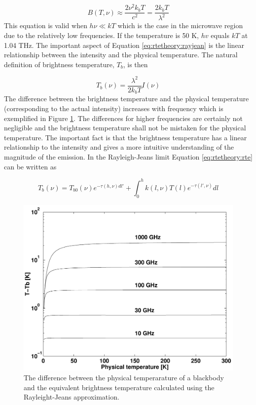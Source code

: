  \begin{equation}
   B(T,\nu) \approx \frac{2\nu^2k_bT}{c^2} = \frac{2k_bT}{\lambda^2}
  \label{eq:rtetheory:rayjean}
 \end{equation}  
 This equation is valid when $h\nu \ll kT$ which is the case in the
 microwave region due to the relatively low frequencies. If the
 temperature is 50 K, $hv$ equals $kT$ at 1.04 THz. The important
 aspect of Equation \ref{eq:rtetheory:rayjean} is the linear relationship
 between the intensity and the physical temperature. The natural
 definition of brightness temperature, $T_b$, is then

 \begin{equation}
   T_b(\nu) = \frac{\lambda^2}{2k_bT} I(\nu)
  \label{eq:rtetheory:tb}
 \end{equation}  
 The difference between the brightness temperature and the physical
 temperature (corresponding to the actual intensity) increases with
 frequency which is exemplified in Figure \ref{fig:rtetheory:rayjean}. The
 differences for higher frequencies are certainly not negligible and
 the brightness temperature shall not be mistaken for the physical
 temperature. The important fact is that the brightness temperature
 has a linear relationship to the intensity and gives a more intuitive
 understanding of the magnitude of the emission. In the Rayleigh-Jeans
 limit Equation \ref{eq:rtetheory:rte} can be written as

 \begin{equation}
   T_b(\nu) = T_{b0}(\nu)e^{-\tau(h,\nu)dl'} + 
     \int^h_0{k(l,\nu)T(l) e^{-\tau(l',\nu)} dl}
  \label{eq:rtetheory:rte_tb}
 \end{equation}  

 \begin{figure}
  \begin{center}
    \includegraphics*[width=0.8\hsize]{fig_rayjean}
    \caption{The difference between the physical temperarature of a 
             blackbody and the equivalent brightness temperature
             calculated using the Rayleight-Jeans approximation.}
    \label{fig:rtetheory:rayjean}
  \end{center}
 \end{figure} 
  
